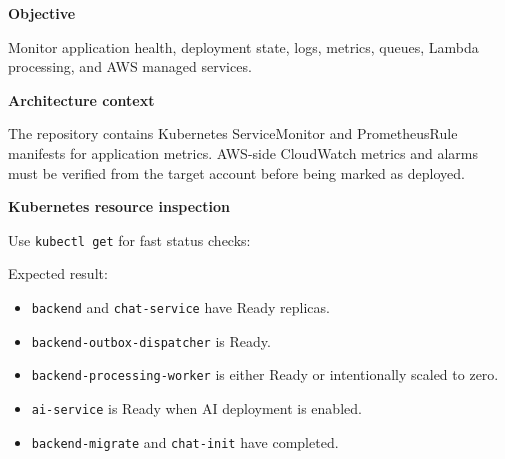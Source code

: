 \vspace{0.5em}\noindent\textbf{Objective}\par

Monitor application health, deployment state, logs, metrics, queues,
Lambda processing, and AWS managed services.

\vspace{0.5em}\noindent\textbf{Architecture context}\par

The repository contains Kubernetes ServiceMonitor and PrometheusRule
manifests for application metrics. AWS-side CloudWatch metrics and
alarms must be verified from the target account before being marked as
deployed.

\vspace{0.5em}\noindent\textbf{Kubernetes resource
inspection}\par

Use \texttt{kubectl\ get} for fast status checks:

\begin{Shaded}
\begin{Highlighting}[]
\OperatorTok{=}
\end{Highlighting}
\end{Shaded}

Expected result:

\begin{itemize}
\tightlist
\item
  \texttt{backend} and \texttt{chat-\allowbreak{}service} have Ready replicas.
\item
  \texttt{backend-\allowbreak{}outbox-\allowbreak{}dispatcher} is Ready.
\item
  \texttt{backend-\allowbreak{}processing-\allowbreak{}worker} is either Ready or intentionally
  scaled to zero.
\item
  \texttt{ai-\allowbreak{}service} is Ready when AI deployment is enabled.
\item
  \texttt{backend-\allowbreak{}migrate} and \texttt{chat-\allowbreak{}init} have completed.
\end{itemize}

